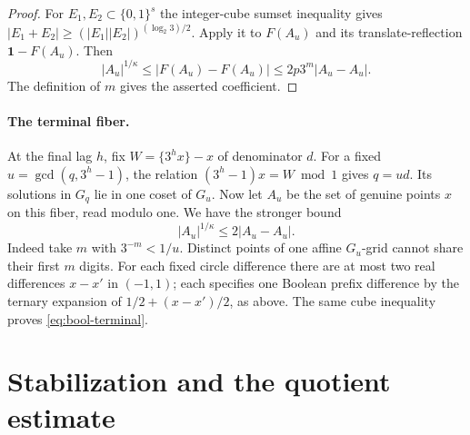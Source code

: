 \begin{proof}
For \(E_1,E_2\subset\{0,1\}^s\) the integer-cube sumset inequality
\cite[Corollary~1.11]{BIMP} gives
\(|E_1+E_2|\ge (|E_1||E_2|)^{(\log_2 3)/2}\). Apply it to
\(F(A_u)\) and its translate-reflection \(\mathbf1-F(A_u)\). Then
\[
 |A_u|^{1/\kappa}\le |F(A_u)-F(A_u)|
     \le 2p3^m |A_u-A_u|.
\]
The definition of \(m\) gives the asserted coefficient.
\end{proof}

\paragraph{The terminal fiber.}
At the final lag \(h\), fix \(W=\{3^h x\}-x\) of denominator \(d\).
For a fixed \(u=\gcd(q,3^h-1)\), the relation
\((3^h-1)x=W\bmod1\) gives \(q=ud\). Its solutions in \(G_q\)
lie in one coset of \(G_u\). Now let \(A_u\) be the set of genuine
points \(x\) on this fiber, read modulo one. We have the stronger
bound
\begin{equation}\label{eq:bool-terminal}
 |A_u|^{1/\kappa}\le 2|A_u-A_u|.
\end{equation}
Indeed take \(m\) with \(3^{-m}<1/u\). Distinct points of one affine
\(G_u\)-grid cannot share their first \(m\) digits. For each fixed
circle difference there are at most two real differences \(x-x'\)
in \((-1,1)\); each specifies one Boolean prefix difference by the
ternary expansion of \(1/2+(x-x')/2\), as above. The same cube
inequality proves \eqref{eq:bool-terminal}.

\section{Stabilization and the quotient estimate}\label{sec:lcm}

